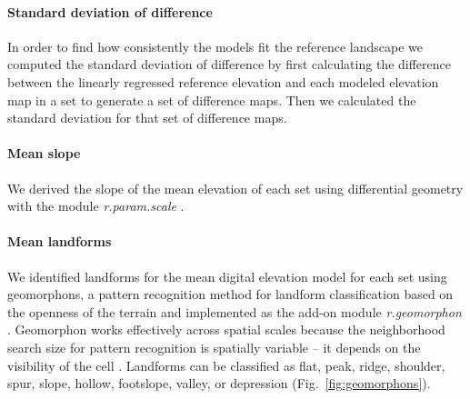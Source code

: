 \documentclass[prodmode,acmtochi]{acmsmall} %
\begin{document}
\paragraph{Standard deviation of difference}
In order to find 
how consistently the models fit the reference landscape
we computed the standard deviation of difference
by first calculating the difference 
between the linearly regressed reference elevation and 
each modeled elevation map in a set
to generate a set of difference maps.
Then we calculated the standard deviation 
for that set of difference maps.  

%
%
%
%
%
%
%

\paragraph{Mean slope}
We derived the slope of the mean elevation of each set %
using differential geometry
\cite{Wood1996} 
with the module \textit{r.param.scale} \cite{r.param.scale}.

\paragraph{Mean landforms}
We identified landforms 
for the mean digital elevation model for each set 
using geomorphons,
a pattern recognition method for landform classification 
based on the openness of the terrain
and implemented as the add-on module \textit{r.geomorphon} \cite{r.geomorphon}.
Geomorphon works effectively across spatial scales because 
the neighborhood search size for pattern recognition 
is spatially variable -- it depends on the visibility of the cell \cite{Jasiewicz2013}.  
Landforms can be classified as flat, peak, ridge, shoulder, spur, slope, hollow, footslope, valley, or depression (Fig.~\ref{fig:geomorphons}).
\end{document}
